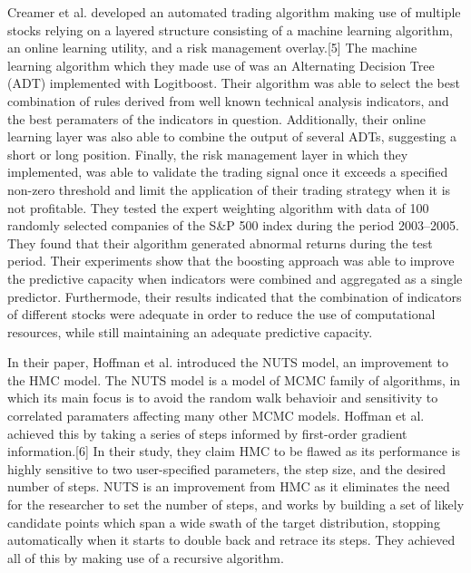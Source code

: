 \documentclass[times]{jtitauth}
\begin{document}
Creamer et al. developed an automated trading algorithm making use of multiple stocks relying on a layered structure consisting of a machine learning algorithm, an online learning utility, and a risk management overlay.[5] The machine learning algorithm which they made use of was an Alternating Decision Tree (ADT) implemented with Logitboost. Their algorithm was able to select the best combination of rules derived from well known technical analysis indicators, and the best peramaters of the indicators in question. Additionally, their online learning layer was also able to combine the output of several ADTs, suggesting a short or long position. Finally, the risk management layer in which they implemented, was able to validate the trading signal once it exceeds a specified non-zero threshold and limit the application of their trading strategy when it is not profitable. They tested the expert weighting algorithm with data of 100 randomly selected companies of the S\&P 500 index during the period 2003–2005. They found that their algorithm generated abnormal returns during the test period. Their experiments show that the boosting approach was able to improve the predictive capacity when indicators were combined and aggregated as a single predictor. Furthermode, their results indicated that the combination of indicators of different stocks were adequate in order to reduce the use of computational resources, while still maintaining an adequate predictive capacity.

In their paper, Hoffman et al. introduced the NUTS model, an improvement to the HMC model. The NUTS model is a model of MCMC family of algorithms, in which its main focus is to avoid the random walk behavioir and sensitivity to correlated paramaters affecting many other MCMC models. Hoffman et al. achieved this by taking a series of steps informed by first-order gradient information.[6] In their study, they claim HMC to be flawed as its performance is highly sensitive to two user-specified parameters, the step size, and the desired number of steps. NUTS is an improvement from HMC as it eliminates the need for the researcher to set the number of steps, and works by building a set of likely candidate points which span a wide swath of the target distribution, stopping automatically when it starts to double back and retrace its steps. They achieved all of this by making use of a recursive algorithm.
\end{document}
